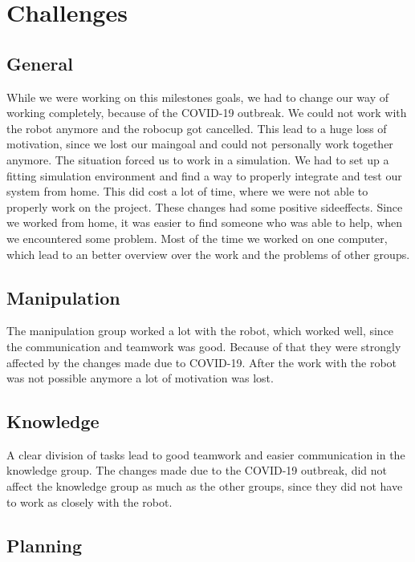 \documentclass[main.tex]{subfiles}
\begin{document}
	
	\chapter{Challenges}

\section{General}

While we were working on this milestones goals, we had to change our way of working completely, because of the COVID-19 outbreak.
We could not work with the robot anymore and the robocup got cancelled. This lead to a huge loss of motivation, since we lost our maingoal and could not personally work together anymore.
The situation forced us to work in a simulation. We had to set up a fitting simulation environment and find a way to properly integrate and test our system from home. This did cost a lot of time, where we were not able to properly work on the project.
These changes had some positive sideeffects. Since we worked from home, it was easier to find someone who was able to help, when we encountered some problem. Most of the time we worked on one computer, which lead to an better overview over the work and the problems of other groups.

\section{Manipulation}

The manipulation group worked a lot with the robot, which worked well, since the communication and teamwork was good.
Because of that they were strongly affected by the changes made due to COVID-19. After the work with the robot was not possible anymore a lot of motivation was lost.

\section{Knowledge}

A clear division of tasks lead to good teamwork and easier communication in the knowledge group.
The changes made due to the COVID-19 outbreak, did not affect the knowledge group as much as the other groups, since they did not have to work as closely with the robot.

\section{Planning}
\end{document}
